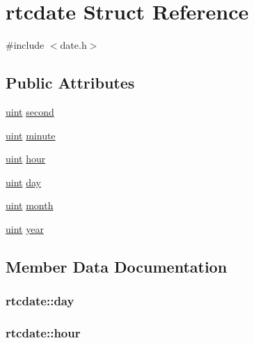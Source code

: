 \hypertarget{structrtcdate}{}\section{rtcdate Struct Reference}
\label{structrtcdate}


{\ttfamily \#include $<$date.\+h$>$}

\subsection*{Public Attributes}
\begin{DoxyCompactItemize}
\item 
\hyperlink{custom__types_8h_a91ad9478d81a7aaf2593e8d9c3d06a14}{uint} \hyperlink{structrtcdate_affc39128483c500d77d1a012fe045664}{second}
\item 
\hyperlink{custom__types_8h_a91ad9478d81a7aaf2593e8d9c3d06a14}{uint} \hyperlink{structrtcdate_a5984e264f332d7634912db2716472aa7}{minute}
\item 
\hyperlink{custom__types_8h_a91ad9478d81a7aaf2593e8d9c3d06a14}{uint} \hyperlink{structrtcdate_ac601418b8ff95c35e8fddb47dd3fc77b}{hour}
\item 
\hyperlink{custom__types_8h_a91ad9478d81a7aaf2593e8d9c3d06a14}{uint} \hyperlink{structrtcdate_a476a4a04d68d88b1515123aa24af8a4d}{day}
\item 
\hyperlink{custom__types_8h_a91ad9478d81a7aaf2593e8d9c3d06a14}{uint} \hyperlink{structrtcdate_a3c509170b31d76f828681c2df54bf0b1}{month}
\item 
\hyperlink{custom__types_8h_a91ad9478d81a7aaf2593e8d9c3d06a14}{uint} \hyperlink{structrtcdate_a143aaaa0a5fcaae876c0af5f135ea5c8}{year}
\end{DoxyCompactItemize}


\subsection{Member Data Documentation}
\subsubsection[{\texorpdfstring{day}{day}}]{ rtcdate\+::day}\hypertarget{structrtcdate_a476a4a04d68d88b1515123aa24af8a4d}{}\label{structrtcdate_a476a4a04d68d88b1515123aa24af8a4d}
\subsubsection[{\texorpdfstring{hour}{hour}}]{ rtcdate\+::hour}\hypertarget{structrtcdate_ac601418b8ff95c35e8fddb47dd3fc77b}{}\label{structrtcdate_ac601418b8ff95c35e8fddb47dd3fc77b}
